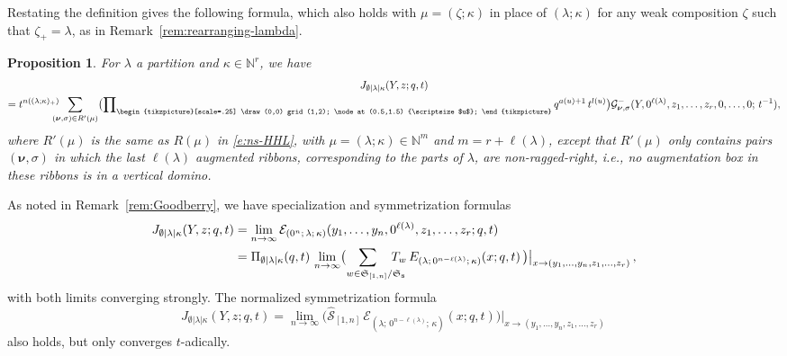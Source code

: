 \documentclass[12pt]{amsart}
\newtheorem{prop}[thm]{Proposition}
\theoremstyle{definition}
\theoremstyle{remark}
\newcommand{\NN}{{\mathbb N}}
\newcommand{\sS}{{\mathbf s}}
\newcommand{\nubold}{{\boldsymbol \nu }}
\newcommand{\Sfrak}{{\mathfrak S}}
\newcommand{\Ecal}{{\mathcal E}}
\newcommand{\Gcal}{{\mathcal G}}
\newcommand{\Scal}{{\mathcal S}}
\newcommand{\domino}{\begin{tikzpicture}[scale=.25]
\draw (0,0) grid (1,2);
\node at (0.5,1.5) {\scriptsize $u$};
\end{tikzpicture}}
\newcommand{\hsym}{\widehat{\Scal}}    %
\newcommand{\Jns}{J}           %
\begin{document}
Restating the definition gives the following formula, which also holds
with $\mu =(\zeta ;\kappa )$ in place of $(\lambda ;\kappa )$ for any
weak composition $\zeta $ such that $\zeta _{+} = \lambda $, as in
Remark~\ref{rem:rearranging-lambda}.

\begin{prop}\label{prop:left-stable-HHL}
For $\lambda $ a partition and $\kappa \in \NN ^{r}$, we have
\begin{multline}\label{e:left-stable-HHL}
\Jns _{\emptyset | \lambda | \kappa }(Y,z;q,t)\\
 = t^{n((\lambda ;\kappa ) _{+})} \hspace{-2ex} \sum _{(\nubold
,\sigma )\in R'(\mu )} \bigl( \prod \nolimits_{\domino } q^{a(u)+1}\,
t^{l(u)} \bigr) \Gcal _{\nubold ,\sigma }^{-}(Y, 0^{\ell (\lambda )},
z_{1}, \ldots, z_{r}, 0, \ldots,0;\, t^{-1}),
\end{multline}
where $R'(\mu )$ is the same as $R(\mu )$ in \eqref{e:ns-HHL}, with
$\mu =(\lambda ;\kappa )\in \NN ^{m}$ and $m=r+\ell(\lambda)$, except
that $R'(\mu )$ only contains pairs $(\nubold ,\sigma )$ in which the
last $\ell (\lambda )$ augmented ribbons, corresponding to the parts
of $\lambda $, are non-ragged-right, i.e., no augmentation box in
these ribbons is in a vertical domino.
\end{prop}

As noted in Remark~\ref{rem:Goodberry}, we have specialization
and symmetrization formulas
\begin{align}\label{e:left-stable-spec}
\Jns _{\emptyset | \lambda | \kappa }(Y,z; q,t) & = \lim_{n\rightarrow
\infty } \Ecal _{(0^{n};\, \lambda ;\, \kappa
)}(y_{1},\ldots,y_{n},0^{\ell
(\lambda )},z_{1},\ldots,z_{r}; q,t)\\
\label{e:left-stable-symm}
& = \Pi _{\emptyset |\lambda |\kappa }(q,t)\, \lim_{n\rightarrow
\infty } \bigl( \sum _{w \in \Sfrak _{[1,n]}/ \Sfrak _{\sS }
\hspace{-3ex}} T_{w}\, E _{(\lambda ;\, 0^{n-\ell (\lambda )};\,
\kappa )}(x;q,t)\, \bigr) \bigr|_{x\rightarrow (y_{1},\ldots,y_{n},
z_{1},\ldots,z_{r})}\, ,
\end{align}
with both limits converging strongly.  The normalized
symmetrization formula
\begin{equation}\label{e:left-stable-normal}
\Jns _{\emptyset | \lambda | \kappa }(Y,z; q,t) = \lim_{n\rightarrow
\infty } \bigl( \hsym _{[1,n]}\, \Ecal _{(\lambda ;\, 0^{n-\ell
(\lambda )};\, \kappa )}(x;q,t) \bigr) \bigr|_{x\rightarrow
(y_{1},\ldots,y_{n}, z_{1},\ldots,z_{r})}\,
\end{equation}
also holds, but only converges $t$-adically.
\end{document}
